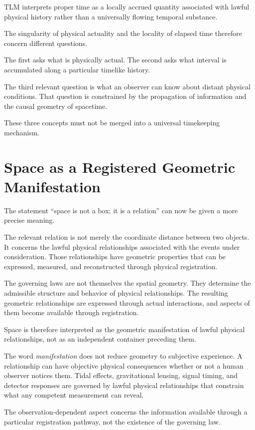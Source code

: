 \documentclass[12pt,onecolumn]{article}
\begin{document}
TLM interprets proper time as a locally accrued quantity associated with lawful physical history rather than a universally flowing temporal substance.

The singularity of physical actuality and the locality of elapsed time therefore concern different questions.

The first asks what is physically actual. The second asks what interval is accumulated along a particular timelike history.

The third relevant question is what an observer can know about distant physical conditions. That question is constrained by the propagation of information and the causal geometry of spacetime.

These three concepts must not be merged into a universal timekeeping mechanism.

\section{Space as a Registered Geometric Manifestation}

The statement ``space is not a box; it is a relation'' can now be given a more precise meaning.

The relevant relation is not merely the coordinate distance between two objects. It concerns the lawful physical relationships associated with the events under consideration. Those relationships have geometric properties that can be expressed, measured, and reconstructed through physical registration.

The governing laws are not themselves the spatial geometry. They determine the admissible structure and behavior of physical relationships. The resulting geometric relationships are expressed through actual interactions, and aspects of them become available through registration.

Space is therefore interpreted as the geometric manifestation of lawful physical relationships, not as an independent container preceding them.

The word \emph{manifestation} does not reduce geometry to subjective experience. A relationship can have objective physical consequences whether or not a human observer notices them. Tidal effects, gravitational lensing, signal timing, and detector responses are governed by lawful physical relationships that constrain what any competent measurement can reveal.

The observation-dependent aspect concerns the information available through a particular registration pathway, not the existence of the governing law.
\end{document}

